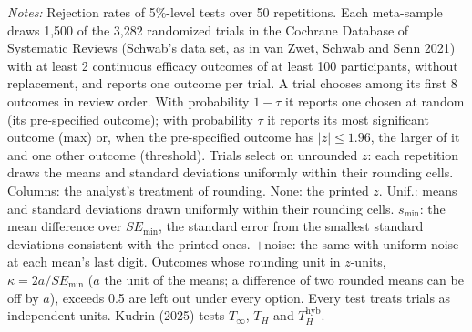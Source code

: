 \begin{table}[htbp]
\begin{minipage}{\linewidth}\footnotesize\textit{Notes:} Rejection rates of 5\%-level tests over 50 repetitions. Each meta-sample draws 1{,}500 of the 3{,}282 randomized trials in the Cochrane Database of Systematic Reviews (Schwab's data set, as in van Zwet, Schwab and Senn 2021) with at least 2 continuous efficacy outcomes of at least 100 participants, without replacement, and reports one outcome per trial. A trial chooses among its first 8 outcomes in review order. With probability $1 - \tau$ it reports one chosen at random (its pre-specified outcome); with probability $\tau$ it reports its most significant outcome (max) or, when the pre-specified outcome has $|z| \le 1.96$, the larger of it and one other outcome (threshold). Trials select on unrounded $z$: each repetition draws the means and standard deviations uniformly within their rounding cells. Columns: the analyst's treatment of rounding. None: the printed $z$. Unif.: means and standard deviations drawn uniformly within their rounding cells. $s_{\min}$: the mean difference over $SE_{\min}$, the standard error from the smallest standard deviations consistent with the printed ones. $+$noise: the same with uniform noise at each mean's last digit. Outcomes whose rounding unit in $z$-units, $\kappa = 2a/SE_{\min}$ ($a$ the unit of the means; a difference of two rounded means can be off by $a$), exceeds 0.5 are left out under every option. Every test treats trials as independent units. Kudrin (2025) tests $T_\infty$, $T_H$ and $T_H^{\mathrm{hyb}}$.\end{minipage}
\end{table}
